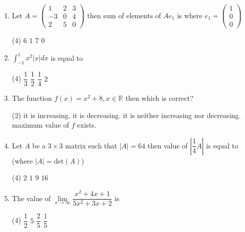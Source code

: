 \documentclass{article}
\renewcommand{\frac}{\dfrac}
\begin{document}
\begin{enumerate}
    \item Let \( A = \begin{pmatrix} 1 & 2 & 3 \\ -3 & 0 & 4 \\ 2 & 5 & 0 \end{pmatrix} \) then sum of elements of \( Ae_1 \) is where \( e_1 = \begin{pmatrix} 1 \\ 0 \\ 0 \end{pmatrix} \)
        \begin{tasks}(4)
            \task \( 6 \)
            \task \( 1 \)
            \task \( 7 \)
            \task \( 0 \)\ans
        \end{tasks}
    \item \(\int_{-1}^{1} x^2 |x| dx \) is equal to
        \begin{tasks}(4)
            \task \( \frac{1}{3} \)
            \task \( \frac{1}{2} \)\ans
            \task \( \frac{1}{4} \)
            \task \( 2 \)
        \end{tasks}
    \item The function \( f(x) = x^2 + 8, x \in \mathbb{R} \) then which is correct?
        \begin{tasks}(2)
            \task it is increasing.
            \task it is decreasing.
            \task it is neither increasing nor decreasing.\ans
            \task maximum value of \( f \) exists.
        \end{tasks}
    \item Let \( A \) be a \(3 \times 3\) matrix such that \( |A| = 64 \) then value of \( \left|\frac{1}{4}A\right| \) is equal to (where \( |A| = \text{det}(A) \))
        \begin{tasks}(4)
            \task \( 2 \)
            \task \( 1 \)\ans
            \task \( 9 \)
            \task \( 16 \)
        \end{tasks}
    \item The value of \( \lim\limits_{x \to \infty} \frac{x^2 + 4x + 1}{5x^2 + 3x + 2} \) is
        \begin{tasks}(4)
            \task \( \frac{1}{2} \)
            \task \( 5 \)
            \task \( \frac{2}{5} \)
            \task \( \frac{1}{5} \)\ans
        \end{tasks}
\end{enumerate}


\end{document}
